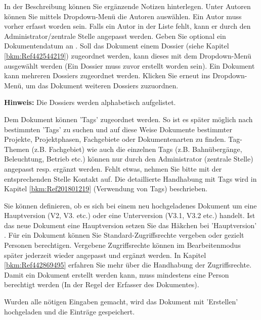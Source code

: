 \vspace{\baselineskip}

In der Beschreibung  können Sie ergänzende Notizen hinterlegen. Unter Autoren  können Sie mittels Dropdown-Menü die Autoren auswählen. Ein Autor muss vorher erfasst worden sein. Falls ein Autor in der Liste fehlt, kann er durch den Administrator/zentrale Stelle angepasst werden. Geben Sie optional ein Dokumentendatum an . Soll das Dokument einem Dossier (siehe Kapitel \ref{bkm:Ref442544219}) zugeordnet werden, kann dieses mit dem Dropdown-Menü  ausgewählt werden (Ein Dossier muss zuvor erstellt worden sein). Ein Dokument kann mehreren Dossiers zugeordnet werden. Klicken Sie erneut ins Dropdown-Menü, um das Dokument weiteren Dossiers zuzuordnen.

\vspace{\baselineskip}

\textbf{Hinweis:} Die Dossiers werden alphabetisch aufgelistet.

\vspace{\baselineskip}

Dem Dokument können 'Tags'  zugeordnet werden. So ist es später möglich nach bestimmten 'Tags' zu suchen und auf diese Weise Dokumente bestimmter Projekte, Projektphasen, Fachgebiete oder Dokumentenarten zu finden. Tag-Themen (z.B. Fachgebiet) wie auch die einzelnen Tags (z.B. Bahnübergänge, Beleuchtung, Betrieb etc.) können nur durch den Administrator (zentrale Stelle) angepasst resp. ergänzt werden. Fehlt etwas, nehmen Sie bitte mit der entsprechenden Stelle Kontakt auf. Die detaillierte Handhabung mit Tags wird in Kapitel \ref{bkm:Ref201801219} (Verwendung von Tags) beschrieben. \newline

Sie können definieren, ob es sich bei einem neu hochgeladenes Dokument um eine Hauptversion (V2, V3. etc.) oder eine Unterversion (V3.1, V3.2 etc.) handelt. Ist das neue Dokument eine Hauptversion setzen Sie das Häkchen bei 'Hauptversion' . Für ein Dokument können Sie Standard-Zugriffsrechte vergeben  oder gezielt Personen berechtigen. Vergebene Zugriffsrechte können im Bearbeitenmodus später jederzeit wieder angepasst und ergänzt werden. In Kapitel \ref{bkm:Ref442869495} erfahren Sie mehr über die Handhabung der Zugriffsrechte. Damit ein Dokument erstellt werden kann, muss mindestens eine Person berechtigt werden (In der Regel der Erfasser des Dokumentes).

Wurden alle nötigen Eingaben gemacht, wird das Dokument mit 'Erstellen'  hochgeladen und die Einträge gespeichert. \newline

